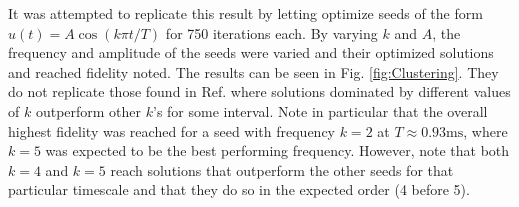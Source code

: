 \documentclass[a4paper, twocolumn]{revtex4-1}
\begin{document}
It was attempted to replicate this result by letting  optimize seeds of the form $u(t) = A\cos(k\pi t/T)$ for 750 iterations each. By varying $k$ and $A$, the frequency and amplitude of the seeds were varied and their optimized solutions and reached fidelity noted. The results can be seen in Fig. \ref{fig:Clustering}. They do not replicate those found in Ref. \cite{QM2Paper} where solutions dominated by different values of $k$ outperform other $k$'s for some interval. Note in particular that the overall highest fidelity was reached for a seed with frequency $k=2$ at $ T\approx 0.93 \text{ms} $, where $ k=5 $ was expected to be the best performing frequency. However, note that both $k=4$ and $k=5$ reach solutions that outperform the other seeds for that particular timescale and that they do so in the expected order (4 before 5).\\
\end{document}
